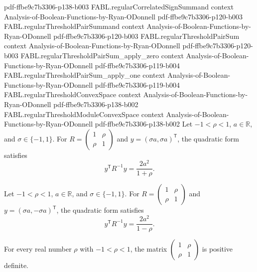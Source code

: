 \begin{theorem}
  {pdf-ffbe9c7b3306-p138-b003}
\proofstep
  {FABL.regularCorrelatedSignSummand}
  {context}
  {Analysis-of-Boolean-Functions-by-Ryan-ODonnell}
  {pdf-ffbe9c7b3306-p120-b003}
\proofstep
  {FABL.regularThresholdPairSummand}
  {context}
  {Analysis-of-Boolean-Functions-by-Ryan-ODonnell}
  {pdf-ffbe9c7b3306-p120-b003}
\proofstep
  {FABL.regularThresholdPairSum}
  {context}
  {Analysis-of-Boolean-Functions-by-Ryan-ODonnell}
  {pdf-ffbe9c7b3306-p120-b003}
\proofstep
  {FABL.regularThresholdPairSum_apply_zero}
  {context}
  {Analysis-of-Boolean-Functions-by-Ryan-ODonnell}
  {pdf-ffbe9c7b3306-p119-b004}
\proofstep
  {FABL.regularThresholdPairSum_apply_one}
  {context}
  {Analysis-of-Boolean-Functions-by-Ryan-ODonnell}
  {pdf-ffbe9c7b3306-p119-b004}
\proofstep
  {FABL.regularThresholdConvexSpace}
  {context}
  {Analysis-of-Boolean-Functions-by-Ryan-ODonnell}
  {pdf-ffbe9c7b3306-p138-b002}
\proofstep
  {FABL.regularThresholdModuleConvexSpace}
  {context}
  {Analysis-of-Boolean-Functions-by-Ryan-ODonnell}
  {pdf-ffbe9c7b3306-p138-b002}
Let $-1<\rho<1$, $a\in\mathbb R$, and $\sigma\in\{-1,1\}$. For
$R=\begin{pmatrix}1&\rho\\\rho&1\end{pmatrix}$ and $y=(\sigma a,\sigma a)^{\mathsf T}$,
the quadratic form satisfies
\[
y^{\mathsf T}R^{-1}y=\frac{2a^2}{1+\rho}.
\]
\end{theorem}

\begin{theorem}
\label{FABL.exercise5_33b_oppositeSigns}
\leanok
{}
Let $-1<\rho<1$, $a\in\mathbb R$, and $\sigma\in\{-1,1\}$. For
$R=\begin{pmatrix}1&\rho\\\rho&1\end{pmatrix}$ and $y=(\sigma a,-\sigma a)^{\mathsf T}$,
the quadratic form satisfies
\[
y^{\mathsf T}R^{-1}y=\frac{2a^2}{1-\rho}.
\]
\end{theorem}

\begin{theorem}
\label{FABL.correlationMatrix_posDef}
\leanok
{}
For every real number $\rho$ with $-1<\rho<1$, the matrix
$\begin{pmatrix}1&\rho\\\rho&1\end{pmatrix}$ is positive definite.
\end{theorem}


